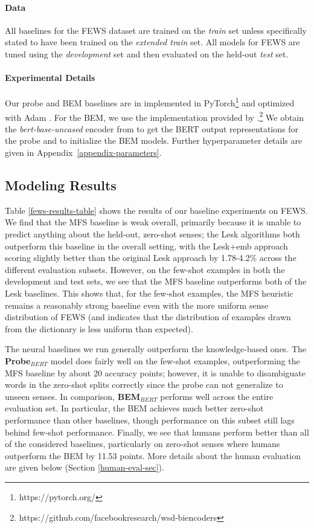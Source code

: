 \documentclass[11pt,a4paper]{article}
\begin{document}
\paragraph{Data} All baselines for the FEWS dataset are trained on the \textit{train} set unless specifically stated to have been trained on the \textit{extended train} set. All models for FEWS are tuned using the \textit{development} set and then evaluated on the held-out \textit{test} set.

\paragraph{Experimental Details}
Our probe and BEM baselines are in implemented in PyTorch\footnote{https://pytorch.org/} and optimized with Adam \cite{kingma2015adam}. For the BEM, we use the implementation provided by \citet{blevins2020moving}.\footnote{https://github.com/facebookresearch/wsd-biencoders} We obtain the \textit{bert-base-uncased} encoder from \citet{Wolf2019HuggingFacesTS} to get the BERT output representations for the probe and to initialize the BEM models. Further hyperparameter details are given in Appendix~\ref{appendix-parameters}. 

\subsection{Modeling Results}
Table \ref{fews-results-table} shows the results of our baseline experiments on FEWS. We find that the MFS baseline is weak overall, primarily because it is unable to predict anything about the held-out, zero-shot senses; the Lesk algorithms both outperform this baseline in the overall setting, with the Lesk+emb approach scoring slightly better than the original Lesk approach by 1.78-4.2\% across the different evaluation subsets. However, on the few-shot examples in both the development and test sets, we see that the MFS baseline outperforms both of the Lesk baselines. This shows that, for the few-shot examples, the MFS heuristic remains a reasonably strong baseline even with the more uniform sense distribution of FEWS (and indicates that the distribution of examples drawn from the dictionary is less uniform than expected).

The neural baselines we run generally outperform the knowledge-based ones. The \textbf{Probe$_{BERT}$} model does fairly well on the few-shot examples, outperforming the MFS baseline by about 20 accuracy points; however, it is unable to disambiguate words in the zero-shot splits correctly since the probe can not generalize to unseen senses. In comparison, \textbf{BEM$_{BERT}$} performs well across the entire evaluation set. In particular, the BEM achieves much better zero-shot performance than other baselines, though performance on this subset still lags behind few-shot performance. Finally, we see that humans perform better than all of the considered baselines, particularly on zero-shot senses where humans outperform the BEM by 11.53 points. More details about the human evaluation are given below (Section \ref{human-eval-sec}).
\end{document}
